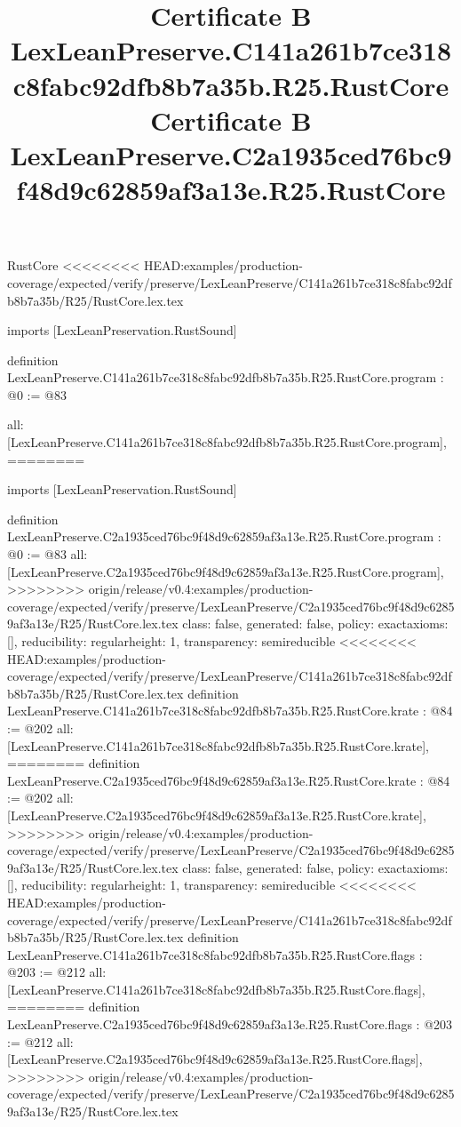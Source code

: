 \begin{lexlean}{RustCore}
<<<<<<<< HEAD:examples/production-coverage/expected/verify/preserve/LexLeanPreserve/C141a261b7ce318c8fabc92dfb8b7a35b/R25/RustCore.lex.tex
\title{Certificate B LexLeanPreserve.C141a261b7ce318c8fabc92dfb8b7a35b.R25.RustCore}
\begin{coremodule}
imports [LexLeanPreservation.RustSound]

definition LexLeanPreserve.C141a261b7ce318c8fabc92dfb8b7a35b.R25.RustCore.program : @0 := @83 {
  all: [LexLeanPreserve.C141a261b7ce318c8fabc92dfb8b7a35b.R25.RustCore.program],
========
\title{Certificate B LexLeanPreserve.C2a1935ced76bc9f48d9c62859af3a13e.R25.RustCore}
\begin{coremodule}
imports [LexLeanPreservation.RustSound]

definition LexLeanPreserve.C2a1935ced76bc9f48d9c62859af3a13e.R25.RustCore.program : @0 := @83 {
  all: [LexLeanPreserve.C2a1935ced76bc9f48d9c62859af3a13e.R25.RustCore.program],
>>>>>>>> origin/release/v0.4:examples/production-coverage/expected/verify/preserve/LexLeanPreserve/C2a1935ced76bc9f48d9c62859af3a13e/R25/RustCore.lex.tex
  class: false,
  generated: false,
  policy: exact{axioms: []},
  reducibility: regular{height: 1},
  transparency: semireducible
}
<<<<<<<< HEAD:examples/production-coverage/expected/verify/preserve/LexLeanPreserve/C141a261b7ce318c8fabc92dfb8b7a35b/R25/RustCore.lex.tex
definition LexLeanPreserve.C141a261b7ce318c8fabc92dfb8b7a35b.R25.RustCore.krate : @84 := @202 {
  all: [LexLeanPreserve.C141a261b7ce318c8fabc92dfb8b7a35b.R25.RustCore.krate],
========
definition LexLeanPreserve.C2a1935ced76bc9f48d9c62859af3a13e.R25.RustCore.krate : @84 := @202 {
  all: [LexLeanPreserve.C2a1935ced76bc9f48d9c62859af3a13e.R25.RustCore.krate],
>>>>>>>> origin/release/v0.4:examples/production-coverage/expected/verify/preserve/LexLeanPreserve/C2a1935ced76bc9f48d9c62859af3a13e/R25/RustCore.lex.tex
  class: false,
  generated: false,
  policy: exact{axioms: []},
  reducibility: regular{height: 1},
  transparency: semireducible
}
<<<<<<<< HEAD:examples/production-coverage/expected/verify/preserve/LexLeanPreserve/C141a261b7ce318c8fabc92dfb8b7a35b/R25/RustCore.lex.tex
definition LexLeanPreserve.C141a261b7ce318c8fabc92dfb8b7a35b.R25.RustCore.flags : @203 := @212 {
  all: [LexLeanPreserve.C141a261b7ce318c8fabc92dfb8b7a35b.R25.RustCore.flags],
========
definition LexLeanPreserve.C2a1935ced76bc9f48d9c62859af3a13e.R25.RustCore.flags : @203 := @212 {
  all: [LexLeanPreserve.C2a1935ced76bc9f48d9c62859af3a13e.R25.RustCore.flags],
>>>>>>>> origin/release/v0.4:examples/production-coverage/expected/verify/preserve/LexLeanPreserve/C2a1935ced76bc9f48d9c62859af3a13e/R25/RustCore.lex.tex
}}}
\end{coremodule}}
\end{coremodule}
\end{lexlean}
